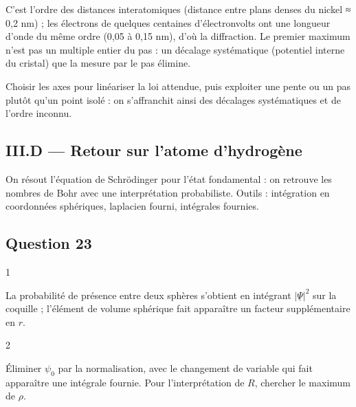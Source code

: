 \documentclass[11pt,a4paper]{article}
\newcommand{\equationajustee}[1]{%
  \sbox{\boiteequation}{$\displaystyle #1$}%
  \ifdim\wd\boiteequation>\linewidth
    \[\resizebox{\linewidth}{!}{\usebox{\boiteequation}}\]%
  \else
    \[#1\]%
  \fi}
\begin{document}
\equationajustee{\boxed{a\simeq2\cdot10^{-10}\ \mathrm m}}

C'est l'ordre des distances interatomiques (distance entre plans denses du nickel ≈ 0,2 nm) ; les électrons de quelques centaines d'électronvolts ont une longueur d'onde du même ordre (0,05 à 0,15 nm), d'où la diffraction. Le premier maximum n'est pas un multiple entier du pas : un décalage systématique (potentiel interne du cristal) que la mesure par le pas élimine.

\begin{methode}

Choisir les axes pour linéariser la loi attendue, puis exploiter une pente ou un pas plutôt qu'un point isolé : on s'affranchit ainsi des décalages systématiques et de l'ordre inconnu.

\end{methode}

\hypertarget{iii.d-retour-sur-latome-dhydroguxe8ne}{%
\subsection{III.D --- Retour sur l'atome d'hydrogène}\label{iii.d-retour-sur-latome-dhydroguxe8ne}}

On résout l'équation de Schrödinger pour l'état fondamental : on retrouve les nombres de Bohr avec une interprétation probabiliste. Outils : intégration en coordonnées sphériques, laplacien fourni, intégrales fournies.

\hypertarget{question-23}{%
\subsection{Question 23}\label{question-23}}

\begin{indication}{1}

La probabilité de présence entre deux sphères s'obtient en intégrant \(|\underline\Psi|^2\) sur la coquille ; l'élément de volume sphérique fait apparaître un facteur supplémentaire en \(r\).

\end{indication}

\begin{indication}{2}

Éliminer \(\psi_0\) par la normalisation, avec le changement de variable qui fait apparaître une intégrale fournie. Pour l'interprétation de \(R\), chercher le maximum de \(\rho\).

\end{indication}
\end{document}
